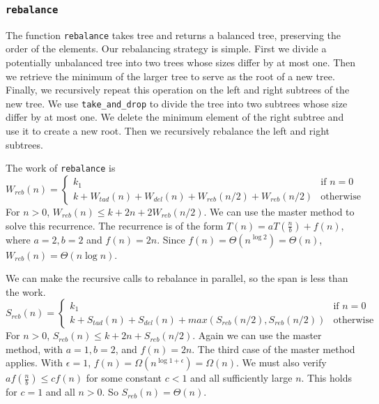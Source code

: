 \documentclass[12pt,letterpaper]{article}
\newcommand{\T}[1]{\texttt{#1}}
\begin{document}
\subsubsection{\T{rebalance}}
The function \T{rebalance} takes tree and returns a balanced tree, preserving the order of the elements.
Our rebalancing strategy is simple. 
First we divide a potentially unbalanced tree into two trees whose sizes differ by at most one.
Then we retrieve the minimum of the larger tree to serve as the root of a new tree.
Finally, we recursively repeat this operation on the left and right subtrees of the new tree.
We use \T{take\_and\_drop} to divide the tree into two subtrees whose size differ by at most one.
We delete the minimum element of the right subtree and use it to create a new root.
Then we recursively rebalance the left and right subtrees.

The work of \T{rebalance} is
\[ W_{reb}(n) = 
  \begin{cases}
    k_1 & \text{if } n=0\\
    k + W_{tad}(n) + W_{del}(n) + W_{reb}(n/2) + W_{reb}(n/2) & \text{otherwise}
  \end{cases}
\]
For $n>0$, $W_{reb}(n) \leq k + 2n + 2W_{reb}(n/2)$.
We can use the master method to solve this recurrence.
The recurrence is of the form $T(n) = aT(\frac{n}{b}) + f(n)$, where $a=2, b=2$ and $f(n) = 2n$.
Since $f(n) = \Theta(n^{\log 2}) = \Theta(n)$, $W_{reb}(n) = \Theta(n\log n)$.

We can make the recursive calls to rebalance in parallel, so the span is less than the work.
\[ S_{reb}(n) = 
  \begin{cases}
    k_1 & \text{if } n=0\\
    k + S_{tad}(n) + S_{del}(n) + max(S_{reb}(n/2),S_{reb}(n/2)) & \text{otherwise}
  \end{cases}
\]
For $n>0$, $S_{reb}(n) \leq k + 2n + S_{reb}(n/2)$.
Again we can use the master method, with $a=1, b=2$, and $f(n) = 2n$.
The third case of the master method applies.
With $\epsilon = 1$, $f(n) = \Omega(n^{\log 1 + \epsilon}) = \Omega(n)$.
We must also verify $a f(\frac{n}{b}) \leq c f(n)$ for some constant $c<1$ and all sufficiently large $n$.
This holds for $c=1$ and all $n>0$.
So $S_{reb}(n) = \Theta(n)$.
\end{document}
